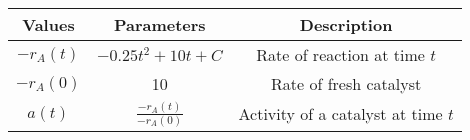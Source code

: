 
\begin{tabular}{|c|c|c|}
\hline
\textbf{Values} & \textbf{Parameters} & \textbf{Description} \\
\hline
$-r_A(t)$ & $-0.25t^2 + 10t + C$ & Rate of reaction at time $t$  \\
\hline
$-r_A(0)$ & 10  & Rate of fresh catalyst  \\
\hline
$a(t)$ & $\frac{-r_A(t)}{-r_A(0)}$ & Activity of a catalyst at time $t$ \\
\hline

\end{tabular}




